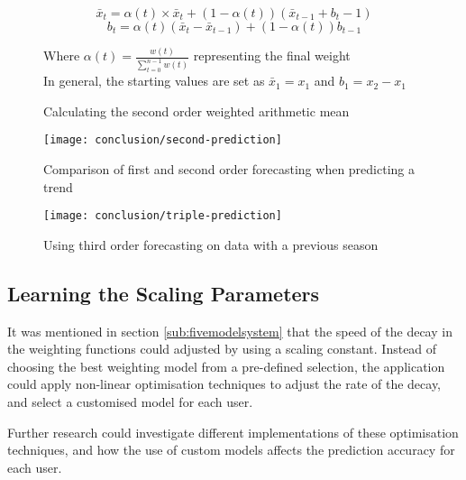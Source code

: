 \begin{figure}
\centering
\[\bar{x}_t = \alpha(t) \times \bar{x}_t + (1 - \alpha(t))(\bar{x}_{t-1} + b_t-1)\]
\[b_t = \alpha(t)(\bar{x}_t - \bar{x}_{t-1}) + (1 - \alpha(t))b_{t-1}\]

Where $\alpha(t) = \frac{w(t)}{\sum_{t=0}^{n-1}{w(t)}}$ representing the final weight\\
In general, the starting values are set as $\bar{x}_1 = x_1$ and $b_1 = x_2 - x_1$

\caption{Calculating the second order weighted arithmetic mean}
\label{fig:second-order-math}
\end{figure}

\begin{figure}
\centering
\texttt{[image: conclusion/second-prediction]}
\caption{Comparison of first and second order forecasting when predicting a trend}
\label{fig:prediction-second}
\end{figure}

\begin{figure}
\centering
\texttt{[image: conclusion/triple-prediction]}
\caption{Using third order forecasting on data with a previous season}
\label{fig:prediction-third}
\end{figure}

\subsection{Learning the Scaling Parameters}
\label{section:learningscalingparameter}
It was mentioned in section \ref{sub:fivemodelsystem} that the speed of the decay in the weighting functions could adjusted by using a scaling constant. Instead of choosing the best weighting model from a pre-defined selection, the application could apply non-linear optimisation techniques to adjust the rate of the decay, and select a customised model for each user. 

Further research could investigate different implementations of these optimisation techniques, and how the use of custom models affects the prediction accuracy for each user.

